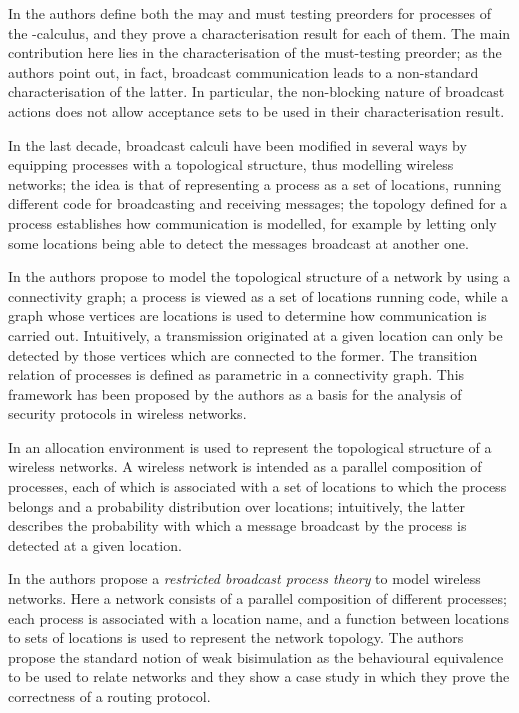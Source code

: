 \documentclass{LMCS}
\begin{document}
In \cite{Ene02} the authors define both the may and must testing preorders for processes of the 
-calculus, and they prove a characterisation result for each of them. 
The main contribution here lies in the characterisation of the must-testing 
preorder; as the authors point out, in fact, broadcast communication leads 
to a non-standard characterisation of the latter. In particular, the non-blocking 
nature of broadcast actions does not allow acceptance sets to be used in their 
characterisation result.

In the last decade, broadcast calculi have been modified in several ways by 
equipping processes with a topological structure, thus modelling wireless 
networks; the idea is that 
of representing a process as a set of locations, running different code 
for broadcasting and receiving messages; the topology defined for a process 
establishes how communication is modelled, for example by letting only some 
locations being able to detect the messages broadcast at another one.

In \cite{NanHan06} the authors propose to model the topological 
structure of a network by using a connectivity graph; a process 
is viewed as a set of locations running code, while a graph 
whose vertices are locations 
is used to determine how communication is carried out. Intuitively, 
a transmission originated at a given location can only be detected 
by those vertices which are connected to the former. The transition 
relation of processes is defined as parametric in a connectivity graph. 
This framework has been proposed by the authors as a basis for the 
analysis of security protocols in wireless networks.

In \cite{nanz} an allocation environment is used to represent the 
topological structure of a wireless networks. A wireless network 
is intended as a parallel composition of processes, each of which 
is associated with a set of locations to which the process belongs 
and a probability distribution 
over locations; intuitively, the latter describes the probability 
with which a message broadcast by the process is detected at a 
given location.

In \cite{restrbroad} the authors propose a \emph{restricted 
broadcast process theory} to model wireless networks. 
Here a network consists of a parallel composition 
of different processes; each process is associated with a location name, 
and a function between locations to sets of locations 
is used to represent the network topology. The authors 
propose the standard notion of weak bisimulation as 
the behavioural equivalence to be used to relate networks 
and they show a case study in which they prove the correctness 
of a routing protocol.
\end{document}
